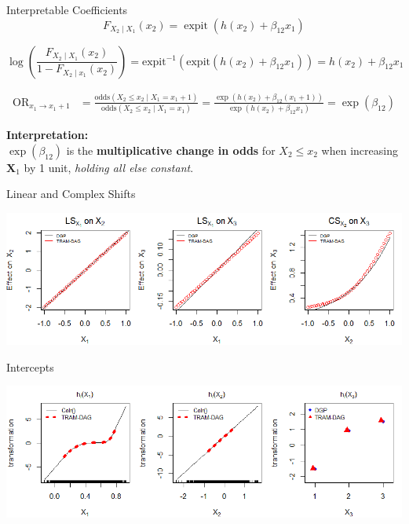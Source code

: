 \documentclass[onlytextwidth,english]{beamer}\usepackage[]{graphicx}\usepackage[]{xcolor}
\begin{document}
\begin{frame}{Interpretable Coefficients}
\small
\[
F_{X_2 \mid X_1}(x_2) = \operatorname{expit}( h(x_2) + \beta_{12} x_1)
\]

\vspace{0.3cm}

\[
\log\left( \frac{F_{X_2 \mid X_1}(x_2)}{1 - F_{X_2 \mid x_1}(x_2)} \right)
= \text{expit}^{-1}( \text{expit}(h(x_2) + \beta_{12} x_1 ))
= h(x_2) + \beta_{12} x_1
\]

\vspace{0.3cm}

\[
\begin{aligned}
\text{OR}_{x_1 \to x_1 + 1}
&= \frac{\text{odds}(X_2 \le x_2 \mid X_1 = x_1 + 1)}{\text{odds}(X_2 \le x_2 \mid X_1 = x_1)} = \frac{\exp(h(x_2) + \beta_{12}(x_1 + 1))}{\exp(h(x_2) + \beta_{12} x_1)} = \exp(\beta_{12})
\end{aligned}
\]

\vspace{0.4cm}

\textbf{Interpretation:} \\
\(\exp(\beta_{12})\) is the \textbf{multiplicative change in odds} for \(X_2 \le x_2\) when increasing \(\mathbf{X}_1\) by 1 unit, \emph{holding all else constant}.

\end{frame}







\begin{frame}{Linear and Complex Shifts}


\includegraphics[width=\linewidth]{img/LS_CS.png}


\end{frame}






\begin{frame}{Intercepts}


\includegraphics[width=\linewidth]{img/baseline_trafo.png}


\end{frame}
\end{document}
